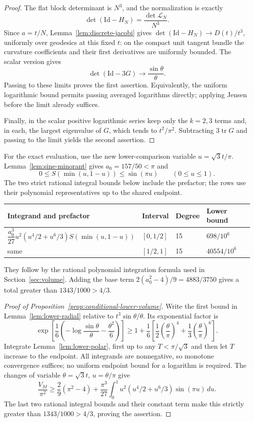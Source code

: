 \begin{proof}
The flat block determinant is $N^3$, and the normalization is exactly
\[
 \det(\mathrm{Id}-H_N)=\frac{\det\mathcal L_N}{N^3}.
\]
Since $a=t/N$, Lemma~\ref{lem:discrete-jacobi} gives
$\det(\mathrm{Id}-H_N)\to D(t)/t^3$, uniformly over geodesics at this
fixed $t$: on the compact unit tangent bundle the curvature coefficients
and their first derivatives are uniformly bounded.  The scalar version gives
\[
 \det(\mathrm{Id}-3G)\longrightarrow\frac{\sin\theta}{\theta}.
\]
Passing to these limits proves the first assertion.  Equivalently, the
uniform logarithmic bound permits passing averaged logarithms directly;
applying Jensen before the limit already suffices.

Finally, in the scalar positive logarithmic series keep only the
$k=2,3$ terms and, in each, the largest eigenvalue of $G$, which tends
to $t^2/\pi^2$.  Subtracting $3\operatorname{tr}G$ and passing to the
limit yields the second assertion.
\end{proof}

For the exact evaluation, use the new lower-comparison variable
$u=\sqrt3t/\pi$. Lemma~\ref{lem:sine-minorant} gives $a_0=157/50<\pi$
and
\[
 0\le S(\min(u,1-u))\le\sin(\pi u)\qquad(0\le u\le1).
\]
The two strict rational integral bounds below include the prefactor;
the rows use their polynomial representatives up to the shared endpoint.
\begin{center}
\begin{tabular}{@{}llll@{}}
\toprule
Integrand and prefactor & Interval & Degree & Lower bound\\
\midrule
$\dfrac{a_0^3}{27}u^2(u^4/2+u^6/3)S(\min(u,1-u))$
 &$[0,1/2]$&15&$698/10^6$\\
same &$[1/2,1]$&15&$40554/10^6$\\
\bottomrule
\end{tabular}
\end{center}
They follow by the rational polynomial integration formula used in
Section~\ref{sec:volume}. Adding the base term
$2(a_0^2-4)/9=4883/3750$ gives a total greater than
$1343/1000>4/3$.

\begin{proof}[Proof of Proposition~\ref{prop:conditional-lower-volume}]
Write the first bound in
Lemma~\ref{lem:lower-radial} relative to $t^3\sin\theta/\theta$.
Its exponential factor is
\[
 \exp\left[\frac16\left(
 -\log\frac{\sin\theta}{\theta}-\frac{\theta^2}{6}\right)\right]
 \ge1+\frac16\left[\frac12\left(\frac\theta\pi\right)^4
                    +\frac13\left(\frac\theta\pi\right)^6\right].
\]
Integrate Lemma~\ref{lem:lower-polar}, first up to any
$T<\pi/\sqrt3$ and then let $T$ increase to the endpoint.  All integrands
are nonnegative, so monotone convergence suffices; no uniform endpoint
bound for a logarithm is required.  The changes of variable
$\theta=\sqrt3t$, $u=\theta/\pi$ give
\[
 \frac{V_M}{\pi^2}
 \ge\frac29(\pi^2-4)
 +\frac{\pi^3}{27}\int_0^1
       u^2(u^4/2+u^6/3)\sin(\pi u)\,du.
\]
The last two rational integral bounds and their constant term make
this strictly greater than $1343/1000>4/3$, proving the assertion.
\end{proof}

